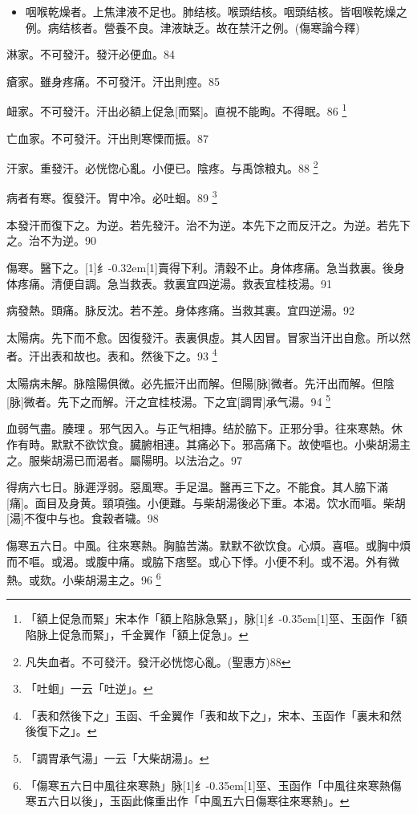\documentclass[11pt,oneside,b5paper]{ctexbook}
\begin{document}
\begin{flushleft}
\begin{itemize}
\item 咽喉乾燥者。上焦津液不足也。肺结核。喉頭结核。咽頭结核。皆咽喉乾燥之例。病结核者。營養不良。津液缺乏。故在禁汗之例。(傷寒論今釋)
\end{itemize}

淋家。不可發汗。發汗必便血。84

瘡家。雖身疼痛。不可發汗。汗出則痙。85

衄家。不可發汗。汗出必額上促急[而緊]。直視不能眴。不得眠。86
\footnote{「額上促急而緊」宋本作「額上陷脉急緊」，脉{\hbox{\scalebox{0.68}[1]{纟}\kern-0.35em\scalebox{0.64}[1]{巠}}}、玉函作「額陷脉上促急而緊」，千金翼作「額上促急」。}

亡血家。不可發汗。汗出則寒慄而振。87

汗家。重發汗。必恍惚心亂。小便已。陰疼。与禹馀粮丸。88
\footnote{凡失血者。不可發汗。發汗必恍惚心亂。(聖惠方)88}

病者有寒。復發汗。胃中冷。必吐蛔。89
\footnote{「吐蛔」一云「吐逆」。}

本發汗而復下之。为逆。若先發汗。治不为逆。本先下之而反汗之。为逆。若先下之。治不为逆。90

傷寒。醫下之。{\hbox{\scalebox{0.6}[1]{纟}\kern-0.32em\scalebox{0.7}[1]{賣}}}得下利。清穀不止。身体疼痛。急当救裏。後身体疼痛。清便自調。急当救表。救裏宜四逆湯。救表宜桂枝湯。91

病發熱。頭痛。脉反沈。若不差。身体疼痛。当救其裏。宜四逆湯。92

太陽病。先下而不愈。因復發汗。表裏俱虛。其人因冒。冒家当汗出自愈。所以然者。汗出表和故也。表和。然後下之。93
\footnote{「表和然後下之」玉函、千金翼作「表和故下之」，宋本、玉函作「裏未和然後復下之」。}

太陽病未解。脉陰陽俱微。必先振汗出而解。但陽[脉]微者。先汗出而解。但陰[脉]微者。先下之而解。汗之宜桂枝湯。下之宜[調胃]承气湯。94
\footnote{「調胃承气湯」一云「大柴胡湯」。}

血弱气盡。腠理{𫔭}。邪气因入。与正气相摶。结於脇下。正邪分爭。往來寒熱。休作有時。默默不欲饮食。臓腑相連。其痛必下。邪高痛下。故使嘔也。小柴胡湯主之。服柴胡湯已而渴者。屬陽明。以法治之。97

得病六七日。脉遲浮弱。惡風寒。手足温。醫再三下之。不能食。其人脇下滿[痛]。面目及身黄。頸項強。小便難。与柴胡湯後必下重。本渴。饮水而嘔。柴胡[湯]不復中与也。食穀者噦。98

傷寒五六日。中風。往來寒熱。胸脇苦滿。默默不欲饮食。心煩。喜嘔。或胸中煩而不嘔。或渴。或腹中痛。或脇下痞堅。或心下悸。小便不利。或不渴。外有微熱。或欬。小柴胡湯主之。96
\footnote{「傷寒五六日中風往來寒熱」脉{\hbox{\scalebox{0.68}[1]{纟}\kern-0.35em\scalebox{0.64}[1]{巠}}}、玉函作「中風往來寒熱傷寒五六日以後」，玉函此條重出作「中風五六日傷寒往來寒熱」。}


\end{flushleft}
\end{document}
